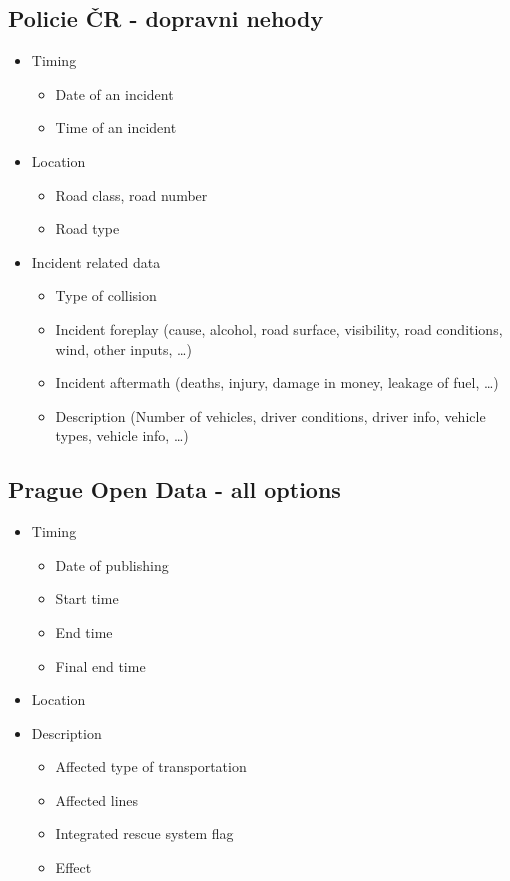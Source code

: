 \subsection{Policie ČR - dopravni nehody}
\begin{itemize}
\item Timing
	\begin{itemize}
	\item Date of an incident
	\item Time of an incident
	\end{itemize}
\item Location
	\begin{itemize}
 \item Road class, road number
 \item Road type
 \end{itemize}
\item Incident related data
	\begin{itemize}
	\item Type of collision
	\item Incident foreplay (cause, alcohol, road surface, visibility, road conditions, wind, other inputs, …)
	\item Incident aftermath (deaths, injury, damage in money, leakage of fuel, …)
	\item Description (Number of vehicles, driver conditions, driver info, vehicle types, vehicle info, …)
	\end{itemize}
\end{itemize}

\subsection{Prague Open Data - all options}
\begin{itemize}
\item Timing
	\begin{itemize}
	\item Date of publishing
	\item Start time
	\item End time
	\item Final end time
	\end{itemize}
\item Location
\item Description
	\begin{itemize}
	\item Affected type of transportation
	\item Affected lines
	\item Integrated rescue system flag
	\item Effect
	\end{itemize}
\end{itemize}

